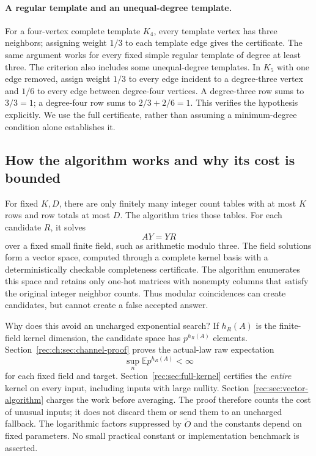 \documentclass[11pt]{article}
\theoremstyle{definition}
\theoremstyle{remark}
\newcommand{\E}{\mathbb E}
\newcommand{\1}{\mathbf 1}
\begin{document}
\paragraph{A regular template and an unequal-degree template.}
For a four-vertex complete template $K_4$, every template vertex has
three neighbors; assigning weight $1/3$ to each template edge gives the
certificate. The same argument works for every fixed simple regular
template of degree at least three.
The criterion also includes some unequal-degree templates. In $K_5$
with one edge removed, assign weight $1/3$ to every edge incident to a
degree-three vertex and $1/6$ to every edge between degree-four vertices.
A degree-three row sums to $3/3=1$; a degree-four row sums to
$2/3+2/6=1$. This verifies the hypothesis explicitly.
We use the full certificate, rather than assuming a minimum-degree
condition alone establishes it.

\subsection{How the algorithm works and why its cost is bounded}
For fixed $K,D$, there are only finitely many integer count tables with
at most $K$ rows and row totals at most $D$. The algorithm tries those
tables. For each candidate $R$, it solves
\[
                              AY=YR
\]
over a fixed small finite field, such as arithmetic modulo three.
The field solutions form a vector space, computed through a complete
kernel basis with a deterministically checkable completeness certificate.
The algorithm enumerates this space and retains only one-hot matrices
with nonempty columns that satisfy the original integer neighbor counts.
Thus modular coincidences can create candidates, but cannot create a
false accepted answer.

Why does this avoid an uncharged exponential search? If $h_R(A)$ is the
finite-field kernel dimension, the candidate space has $p^{h_R(A)}$
elements. Section~\ref{rec:ch:sec:channel-proof} proves the actual-law
raw expectation
\[
                              \sup_n\E p^{h_R(A)}<\infty
\]
for each fixed field and target. Section~\ref{rec:sec:full-kernel}
certifies the \emph{entire} kernel on every input, including inputs with
large nullity. Section~\ref{rec:sec:vector-algorithm} charges the work
before averaging. The proof therefore counts the cost of unusual inputs;
it does not discard them or send them to an uncharged fallback.
The logarithmic factors suppressed by $\widetilde O$ and the constants
depend on fixed parameters. No small practical constant or implementation
benchmark is asserted.
\end{document}

